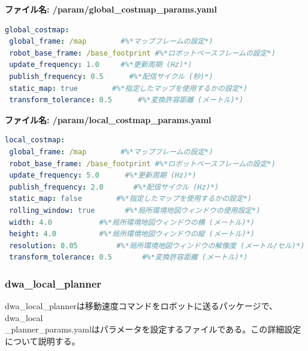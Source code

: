 \textbf{ファイル名: /param/global\_costmap\_params.yaml}
\begin{lstlisting}[language=YAML]
global_costmap:
 global_frame: /map        #%*マップフレームの設定*)
 robot_base_frame: /base_footprint #%*ロボットベースフレームの設定*)
 update_frequency: 1.0     #%*更新周期 (Hz)*)
 publish_frequency: 0.5      #%*配信サイクル (秒)*)
 static_map: true        #%*指定したマップを使用するかの設定*)
 transform_tolerance: 0.5      #%*変換許容距離 (メートル)*)
\end{lstlisting}

\textbf{ファイル名: /param/local\_costmap\_params.yaml}
\begin{lstlisting}[language=YAML]
local_costmap:
 global_frame: /map        #%*マップフレームの設定*)
 robot_base_frame: /base_footprint #%*ロボットベースフレームの設定*)
 update_frequency: 5.0      #%*更新周期 (Hz)*)
 publish_frequency: 2.0       #%*配信サイクル (Hz)*)
 static_map: false        #%*指定したマップを使用するかの設定*)
 rolling_window: true       #%*局所環境地図ウィンドウの使用設定*)
 width: 4.0           #%*局所環境地図ウィンドウの横 (メートル)*)
 height: 4.0          #%*局所環境地図ウィンドウの縦 (メートル)*)
 resolution: 0.05         #%*局所環境地図ウィンドウの解像度 (メートル/セル)*)
 transform_tolerance: 0.5       #%*変換許容距離 (メートル)*)
\end{lstlisting}

\subsubsection{dwa\_local\_planner}

dwa\_local\_plannerは移動速度コマンドをロボットに送るパッケージで、dwa\_local\\\_planner\_params.yamlはパラメータを設定するファイルである。この詳細設定について説明する。

